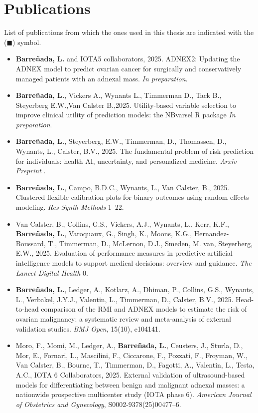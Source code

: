 \chapter*{Publications}

List of publications from which the ones used in this thesis are indicated with the ($\blacksquare$) symbol. 
\begin{itemize}
    \item[$\blacksquare$] \textbf{Barreñada, L.} and IOTA5 collaborators, 2025. ADNEX2: Updating the ADNEX model to predict ovarian cancer for surgically and conservatively managed patients with an adnexal mass. \textit{In preparation}.
    \item[$\blacksquare$] \textbf{Barreñada, L.}, Vickers A., Wynants L., Timmerman D., Tack B., Steyerberg E.W.,Van Calster B.,2025. Utility-based variable selection to improve clinical utility of prediction models: the NBvarsel R package \textit{In preparation}.
    \item[$\blacksquare$] \textbf{Barreñada, L.}, Steyerberg, E.W., Timmerman, D., Thomassen, D., Wynants, L., Calster, B.V., 2025. The fundamental problem of risk prediction for individuals: health AI, uncertainty, and personalized medicine. \textit{Arxiv Preprint} .
    \item[$\blacksquare$] \textbf{Barreñada, L.}, Campo, B.D.C., Wynants, L., Van Calster, B., 2025. Clustered flexible calibration plots for binary outcomes using random effects modeling. \textit{Res Synth Methods} 1–22.

	\item Van Calster, B., Collins, G.S., Vickers, A.J., Wynants, L., Kerr, K.F., \textbf{Barreñada, L.}, Varoquaux, G., Singh, K., Moons, K.G., Hernandez-Boussard, T., Timmerman, D., McLernon, D.J., Smeden, M. van, Steyerberg, E.W., 2025. Evaluation of performance measures in predictive artificial intelligence models to support medical decisions: overview and guidance. \textit{The Lancet Digital Health} 0.
	\item[$\blacksquare$] \textbf{Barreñada, L.}, Ledger, A., Kotlarz, A., Dhiman, P., Collins, G.S., Wynants, L., Verbakel, J.Y.J., Valentin, L., Timmerman, D., Calster, B.V., 2025. Head-to-head comparison of the RMI and ADNEX models to estimate the risk of ovarian malignancy: a systematic review and meta-analysis of external validation studies. \textit{BMJ Open}, 15(10), e104141.

	\item Moro, F., Momi, M., Ledger, A., \textbf{Barreñada, L.}, Ceusters, J., Sturla, D., Mor, E., Fornari, L., Mascilini, F., Ciccarone, F., Pozzati, F., Froyman, W., Van Calster, B., Bourne, T., Timmerman, D., Fagotti, A., Valentin, L., Testa, A.C., IOTA 6 Collaborators, 2025. External validation of ultrasound-based models for differentiating between benign and malignant adnexal masses: a nationwide prospective multicenter study (IOTA phase 6). \textit{American Journal of Obstetrics and Gynecology}, S0002-9378(25)00477–6.


\end{itemize}

